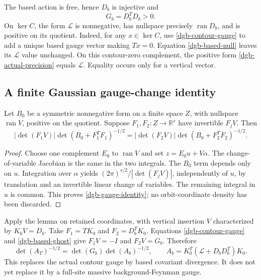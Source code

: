 The based action is free, hence $D_b$ is injective and
\begin{equation}
                              G_b=D_b^TD_b>0.
 \label{dgb-based-ghost}
\end{equation}
On $\ker C$, the form $\mathcal L$ is nonnegative, has
nullspace precisely $\operatorname{ran}D_b$, and is positive
on its quotient. Indeed, for any $x\in\ker C$, use
\eqref{dgb-contour-gauge} to add a unique based gauge vector
making $Tx=0$. Equation \eqref{dgb-based-null} leaves its
$\mathcal L$ value unchanged. On this contour-zero complement,
the positive form \eqref{dgb-actual-precision} equals
$\mathcal L$. Equality occurs only for a vertical vector.

\subsection{A finite Gaussian gauge-change identity}
\label{dgb-gauge-change-section}

\begin{lemma}
\label{dgb-gauge-lemma}
Let $B_0$ be a symmetric nonnegative form on a finite space
$Z$, with nullspace $\operatorname{ran}V$, positive on the
quotient. Suppose $F_1,F_2:Z\to\mathbb R^s$ have invertible
$F_jV$. Then
\begin{equation}
 |\det(F_1V)|\det(B_0+F_1^TF_1)^{-1/2}
   =|\det(F_2V)|\det(B_0+F_2^TF_2)^{-1/2}.
 \label{dgb-gauge-identity}
\end{equation}
\end{lemma}

\begin{proof}
Choose one complement $E_0$ to $\operatorname{ran}V$ and set
$z=E_0u+V\alpha$. The change-of-variable Jacobian is the same
in the two integrals. The $B_0$ term depends only on $u$.
Integration over $\alpha$ yields
$(2\pi)^{s/2}/|\det(F_jV)|$, independently of $u$, by
translation and an invertible linear change of variables.
The remaining integral in $u$ is common. This proves
\eqref{dgb-gauge-identity}; no orbit-coordinate density
has been discarded.
\end{proof}

Apply the lemma on retained coordinates, with vertical insertion
$V$ characterized by $K_0V=D_b$. Take
$F_1=TK_0$ and $F_2=D_b^TK_0$. Equations
\eqref{dgb-contour-gauge} and \eqref{dgb-based-ghost} give
$F_1V=-I$ and $F_2V=G_b$. Therefore
\begin{equation}
 \det(A_T)^{-1/2}
     =\det(G_b)\det(A_b)^{-1/2},\qquad
 A_b=K_0^T(\mathcal L+D_bD_b^T)K_0.
 \label{dgb-divergence-replacement}
\end{equation}
This replaces the actual contour gauge by based covariant
divergence. It does not yet replace it by a full-site massive
background-Feynman gauge.

